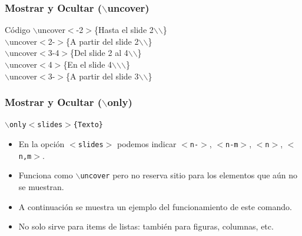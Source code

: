 \documentclass[aspectratio=43]{beamer}%
\begin{document}
\begin{frame}[fragile]
\frametitle{\textbf{Mostrar y Ocultar ($\backslash$uncover)}}
\justifying
 
 
\begin{exampleblock}{Código}
$\backslash$uncover$<$-2$>$\{Hasta el slide 2$\backslash$$\backslash$\}\\
$\backslash$uncover$<$2-$>$\{A partir del slide 2$\backslash$$\backslash$\}\\
$\backslash$uncover$<$3-4$>$\{Del slide 2 al 4$\backslash$$\backslash$\}\\
$\backslash$uncover$<$4$>$\{En el slide 4$\backslash$$\backslash$$\backslash$\} \\
$\backslash$uncover$<$3-$>$\{A partir del slide 3$\backslash$$\backslash$\}
\end{exampleblock}

 
\end{frame}

\begin{frame}[fragile]
\frametitle{\textbf{Mostrar y Ocultar ($\backslash$only)}}
\justifying
  \texttt{$\backslash$only$<$slides$>$\{Texto\}}
 \begin{itemize}\justifying
  \item En la opción \texttt{$<$slides$>$} podemos indicar \texttt{$<$n-$>$}, \texttt{$<$n-m$>$}, \texttt{$<$n$>$}, \texttt{$<$n,m$>$}.
  \item Funciona como \texttt{$\backslash$uncover} pero no reserva sitio para los elementos que aún no se muestran.
  \item A continuación se muestra un ejemplo del funcionamiento de este comando.
  \item No solo sirve para items de listas: también para figuras, columnas, etc.
\end{itemize}

\end{frame}
\end{document}
